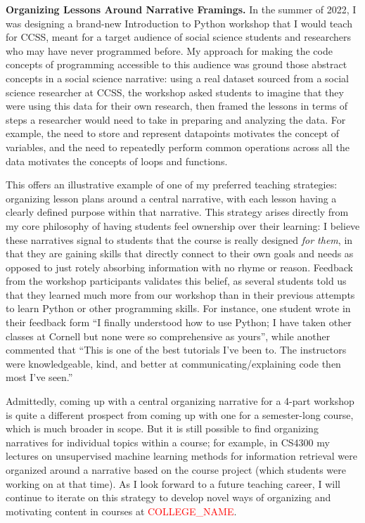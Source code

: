 \documentclass[11pt,letterpaper]{article}
\renewcommand{\section}[1]{\vspace{0.25\baselineskip}\noindent\textbf{#1.}}
\newcommand{\schoolname}{\textcolor{red}{COLLEGE\_NAME}\xspace} %
\begin{document}
\section{Organizing Lessons Around Narrative Framings}
In the summer of 2022, I was designing a brand-new Introduction to Python workshop that I would teach for CCSS, meant for a target audience of social science students and researchers who may have never programmed before.
My approach for making the code concepts of programming accessible to this audience was ground those abstract concepts in a social science narrative: using a real dataset sourced from a social science researcher at CCSS, the workshop asked students to imagine that they were using this data for their own research, then framed the lessons in terms of steps a researcher would need to take in preparing and analyzing the data.
For example, the need to store and represent datapoints motivates the concept of variables, and the need to repeatedly perform common operations across all the data motivates the concepts of loops and functions.

This offers an illustrative example of one of my preferred teaching strategies: organizing lesson plans around a central narrative, with each lesson having a clearly defined purpose within that narrative.
This strategy arises directly from my core philosophy of having students feel ownership over their learning: I believe these narratives signal to students that the course is really designed \emph{for them}, in that they are gaining skills that directly connect to their own goals and needs as opposed to just rotely absorbing information with no rhyme or reason.
Feedback from the workshop participants validates this belief, as several students told us that they learned much more from our workshop than in their previous attempts to learn Python or other programming skills.
For instance, one student wrote in their feedback form ``I finally understood how to use Python; I have taken other classes at Cornell but none were so comprehensive as yours'', while another commented that ``This is one of the best tutorials I've been to. The instructors were knowledgeable, kind, and better at communicating/explaining code then most I've seen.''

Admittedly, coming up with a central organizing narrative for a 4-part workshop is quite a different prospect from coming up with one for a semester-long course, which is much broader in scope.
But it is still possible to find organizing narratives for individual topics within a course; for example, in CS4300 my lectures on unsupervised machine learning methods for information retrieval were organized around a narrative based on the course project (which students were working on at that time).
As I look forward to a future teaching career, I will continue to iterate on this strategy to develop novel ways of organizing and motivating content in courses at \schoolname.
\end{document}
